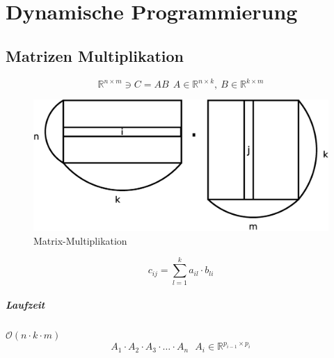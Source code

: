 \chapter{Dynamische Programmierung}
\section{Matrizen Multiplikation}
\[ \mathbb{R}^{n\times m} \ni C = AB~~ A\in\mathbb{R}^{n\times k},~B\in\mathbb{R}^{k\times m}  \]
\begin{figure}[H]
	\centering
	\includegraphics[width=0.5\linewidth]{29/Grafik/Diagramm1}
	\caption{Matrix-Multiplikation}
	\label{fig:Matrix-Multiplikation}
\end{figure}
\[ c_{ij} = \sum_{l = 1}^{k} a_{il}\cdot b_{li} \]
\paragraph{Laufzeit} $\mathcal{O}(n\cdot k\cdot m)$
\[ A_1\cdot A_2\cdot A_3\cdot\ldots\cdot A_n ~~~ A_i\in\mathbb{R}^{p_{i-1}\times p_i} \]
